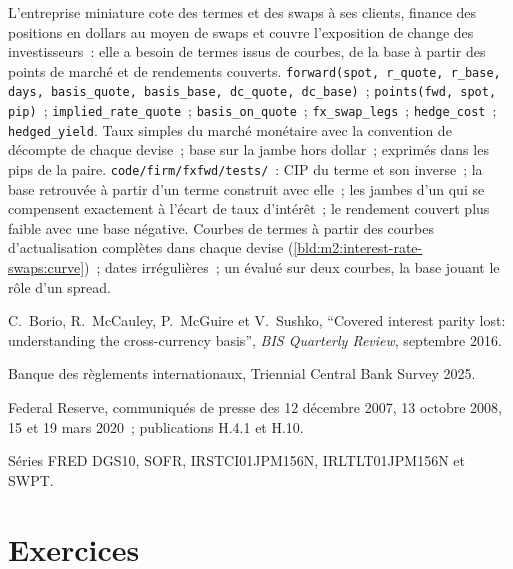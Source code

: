 \begin{build}
 L'entreprise miniature cote des termes et des swaps à ses clients, finance des positions
en dollars au moyen de swaps et couvre l'exposition de change des investisseurs~: elle a besoin de
termes issus de courbes, de la base à partir des points de marché et de rendements couverts.  \texttt{forward(spot, r\_quote, r\_base, days, basis\_quote,
basis\_base, dc\_quote, dc\_base)}~; \texttt{points(fwd, spot, pip)}~;
\texttt{implied\_rate\_quote}~; \texttt{basis\_on\_quote}~; \texttt{fx\_swap\_legs}~;
\texttt{hedge\_cost}~; \texttt{hedged\_yield}.
 Taux simples du marché monétaire avec la convention de décompte de chaque devise~;
base sur la jambe hors dollar~;  exprimés dans les pips de la paire.
 \texttt{code/firm/fxfwd/tests/}~: CIP du terme et son inverse~; la base
retrouvée à partir d'un terme construit avec elle~; les jambes d'un  qui se compensent
exactement à l'écart de taux d'intérêt~; le rendement couvert plus faible avec une base négative.
 Courbes de termes à partir des courbes d'actualisation complètes dans
chaque devise (\cref{bld:m2:interest-rate-swaps:curve})~; dates irrégulières~; un 
évalué sur deux courbes, la base jouant le rôle d'un spread.
\end{build}

\begin{omsources}
\item C.~Borio, R.~McCauley, P.~McGuire et V.~Sushko, ``Covered interest parity lost: understanding the cross-currency basis'', \emph{BIS Quarterly Review},
septembre 2016.
\item Banque des règlements internationaux, Triennial Central Bank Survey 2025.
\item Federal Reserve, communiqués de presse des 12 décembre 2007, 13 octobre 2008, 15
et 19 mars 2020~; publications H.4.1 et H.10.
\item Séries FRED DGS10, SOFR, IRSTCI01JPM156N, IRLTLT01JPM156N et SWPT.
\end{omsources}

\section{Exercices}


